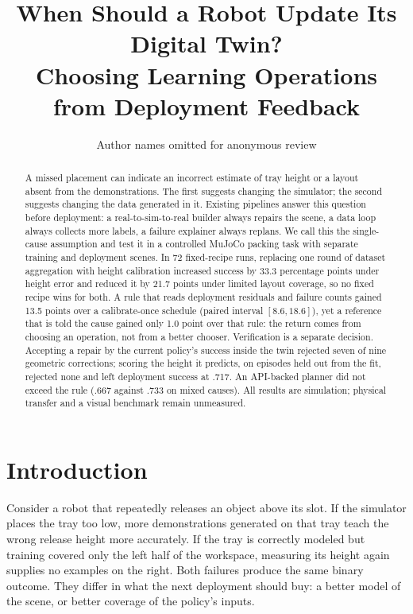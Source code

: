 \documentclass[conference]{IEEEtran}
\begin{document}
\title{When Should a Robot Update Its Digital Twin?\\Choosing Learning Operations from Deployment Feedback}
\author{Author names omitted for anonymous review}
\maketitle

\begin{abstract}
A missed placement can indicate an incorrect estimate of tray height or a layout absent from the demonstrations. The first suggests changing the simulator; the second suggests changing the data generated in it. Existing pipelines answer this question before deployment: a real-to-sim-to-real builder always repairs the scene, a data loop always collects more labels, a failure explainer always replans. We call this the single-cause assumption and test it in a controlled MuJoCo packing task with separate training and deployment scenes. In 72 fixed-recipe runs, replacing one round of dataset aggregation with height calibration increased success by 33.3 percentage points under height error and reduced it by 21.7 points under limited layout coverage, so no fixed recipe wins for both. A rule that reads deployment residuals and failure counts gained 13.5 points over a calibrate-once schedule (paired interval $[8.6,18.6]$), yet a reference that is told the cause gained only 1.0 point over that rule: the return comes from choosing an operation, not from a better chooser. Verification is a separate decision. Accepting a repair by the current policy's success inside the twin rejected seven of nine geometric corrections; scoring the height it predicts, on episodes held out from the fit, rejected none and left deployment success at .717. An API-backed planner did not exceed the rule (.667 against .733 on mixed causes). All results are simulation; physical transfer and a visual benchmark remain unmeasured.
\end{abstract}
\IEEEpeerreviewmaketitle

\section{Introduction}
Consider a robot that repeatedly releases an object above its slot. If the simulator places the tray too low, more demonstrations generated on that tray teach the wrong release height more accurately. If the tray is correctly modeled but training covered only the left half of the workspace, measuring its height again supplies no examples on the right. Both failures produce the same binary outcome. They differ in what the next deployment should buy: a better model of the scene, or better coverage of the policy's inputs.
\end{document}
